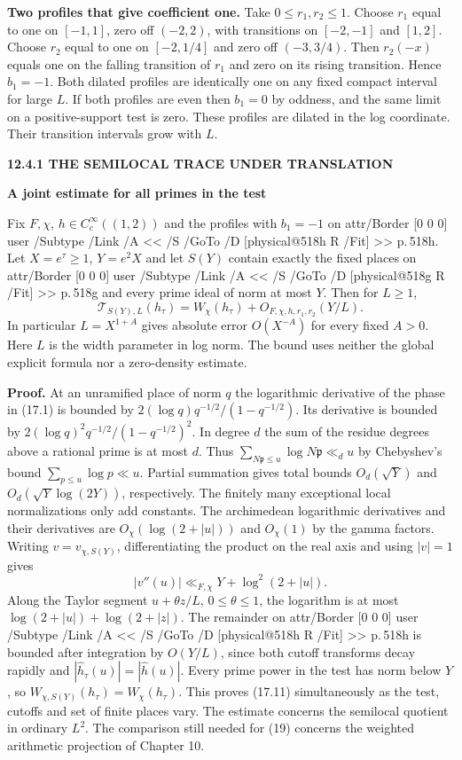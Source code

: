 \documentclass[11pt,letterpaper]{article}
\makeatletter
\newcommand{\rightmarktext}{}
\newcommand{\printfolio}{}
\newcommand{\leaf}[4]{\clearpage\gdef\printfolio{#1}\gdef\rightmarktext{#2}%
  {\small\sffamily\bfseries\color{ink}#3\par}\vspace{3pt}%
  {\LARGE\bfseries #4\par}\vspace{5pt}}
\newcommand{\point}[1]{\par\smallskip\textbf{#1.}\enspace\ignorespaces}
\newcommand{\MusicPDFPageRef}[1]{\pdfpageref\csname physical@#1\endcsname\space\space 0 R}
\newcommand{\pagelink}[2]{\leavevmode\pdfstartlink attr{/Border [0 0 0]} user{%
  /Subtype /Link /A << /S /GoTo /D [\MusicPDFPageRef{#1} /Fit] >>}%
  {\color{ink}#2}\pdfendlink}
\newcommand{\pg}[1]{\pagelink{#1}{p.\,#1}}
\makeatother
\begin{document}
\point{Two profiles that give coefficient one}
Take $0\le r_1,r_2\le1$. Choose $r_1$ equal to one on $[-1,1]$,
zero off $(-2,2)$, with transitions on $[-2,-1]$ and $[1,2]$.
Choose $r_2$ equal to one on $[-2,1/4]$ and zero off $(-3,3/4)$.
Then $r_2(-x)$ equals one on the falling transition of $r_1$ and
zero on its rising transition. Hence $b_1=-1$. Both dilated profiles
are identically one on any fixed compact interval for large $L$.
If both profiles are even then $b_1=0$ by oddness, and the same
limit on a positive-support test is zero. These profiles are dilated
in the log coordinate. Their transition intervals grow with $L$.

\leaf{518i}{Uniformity in the prime cutoff}{12.4.1 \quad THE SEMILOCAL TRACE UNDER TRANSLATION}{A joint estimate for all primes in the test}
Fix $F,\chi$, $h\in C_c^\infty((1,2))$ and the profiles with $b_1=-1$
on \pg{518h}. Let $X=e^\tau\ge1$, $Y=e^2X$ and let $S(Y)$ contain
exactly the fixed places on \pg{518g} and every prime ideal of norm
at most $Y$. Then for $L\ge1$,
\[
 \boxed{\quad
  \mathcal T_{S(Y),L}(h_\tau)=W_\chi(h_\tau)+O_{F,\chi,h,r_1,r_2}(Y/L).
 \quad}
 \tag{17.11}
\]
In particular $L=X^{1+A}$ gives absolute error $O(X^{-A})$ for every
fixed $A>0$. Here $L$ is the width parameter in log norm. The bound
uses neither the global explicit formula nor a zero-density estimate.

\point{Proof} At an unramified place of norm $q$ the logarithmic
derivative of the phase in (17.1) is bounded by
$2(\log q)q^{-1/2}/(1-q^{-1/2})$. Its derivative is bounded by
$2(\log q)^2q^{-1/2}/(1-q^{-1/2})^2$. In degree $d$ the sum of the
residue degrees above a rational prime is at most $d$. Thus
$\sum_{N\mathfrak p\le u}\log N\mathfrak p\ll_d u$ by Chebyshev's
bound $\sum_{p\le u}\log p\ll u$. Partial summation gives total
bounds $O_d(\sqrt Y)$ and $O_d(\sqrt Y\log(2Y))$, respectively.
The finitely many exceptional local normalizations only add constants.
The archimedean logarithmic derivatives and their derivatives are
$O_\chi(\log(2+|u|))$ and $O_\chi(1)$ by the gamma factors.
Writing $v=v_{\chi,S(Y)}$, differentiating the product on the real
axis and using $|v|=1$ gives
\[
                     |v''(u)|\ll_{F,\chi} Y+\log^2(2+|u|).
\]
Along the Taylor segment $u+\theta z/L$, $0\le\theta\le1$, the
logarithm is at most $\log(2+|u|)+\log(2+|z|)$.
The remainder on \pg{518h} is bounded after integration by $O(Y/L)$,
since both cutoff transforms decay rapidly and
$|\widehat h_\tau(u)|=|\widehat h(u)|$. Every prime power in the test
has norm below $Y$, so $W_{\chi,S(Y)}(h_\tau)=W_\chi(h_\tau)$.
This proves (17.11) simultaneously as the test, cutoffs and set of
finite places vary. The estimate concerns the semilocal quotient in
ordinary $L^2$. The comparison still needed for (19) concerns the
weighted arithmetic projection of Chapter 10.
\end{document}
